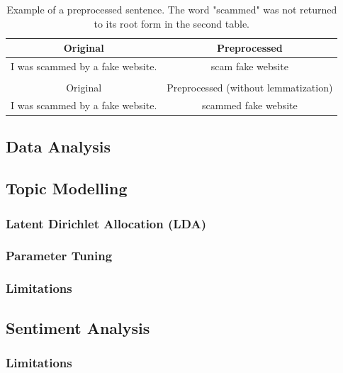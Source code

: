 \documentclass[12pt,english,titlepage,a4paper]{article}
\begin{document}
\begin{table}[h]
    \centering
    \begin{tabular}{cc}
        Original & Preprocessed \\ \hline
        I was scammed by a fake website. & scam fake website \\
        \\
        Original & Preprocessed (without lemmatization) \\ \hline
        I was scammed by a fake website. & scammed fake website \\
    \end{tabular}
    \caption{Example of a preprocessed sentence. The word "scammed" was not returned to its root form in the second table.}
    \label{tab:preprocessing}
\end{table}





\subsection{Data Analysis}

\subsection{Topic Modelling}
\subsubsection{Latent Dirichlet Allocation (LDA)}
\subsubsection{Parameter Tuning}
\subsubsection{Limitations}
\subsection{Sentiment Analysis}
\subsubsection{Limitations}

\end{document}
